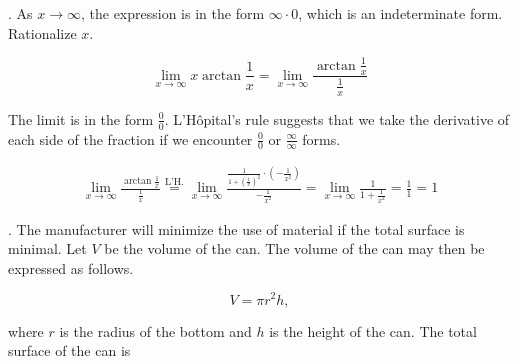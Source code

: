 \documentclass{article}
\begin{document}
\hfill

\begin{center}
\end{center}

\newpage

. As $x\to\infty$, the expression is in the form $\infty\cdot 0$, which is an indeterminate form. Rationalize $x$.

\[\lim_{x\to\infty}x\arctan\frac1x=\lim_{x\to\infty}\frac{\displaystyle\arctan\frac1x}{\displaystyle\frac1x}\]

\hfill

\noindent The limit is in the form $\displaystyle\frac00$. L'Hôpital's rule suggests that we take the derivative of each side of the fraction if we encounter $\displaystyle\frac00$ or $\displaystyle\frac\infty\infty$ forms.

\begin{align*}\lim_{x\to\infty}\frac{\displaystyle\arctan\frac1x}{\displaystyle\frac1x}\overset{\text{L'H.}}{=}\lim_{x\to\infty}\frac{\displaystyle\frac1{1+\left(\frac1x\right)^2}\cdot\left(-\frac1{x^2}\right)}{\displaystyle-\frac1{x^2}}=\lim_{x\to\infty}\frac1{\displaystyle1+\frac1{x^2}}=\frac11=\boxed{1}\end{align*}

\hfill

. The manufacturer will minimize the use of material if the total surface is minimal. Let $V$ be the volume of the can. The volume of the can may then be expressed as follows.

\[V=\pi r^2h,\]

\hfill

\noindent where $r$ is the radius of the bottom and $h$ is the height of the can. The total surface of the can is
\end{document}
